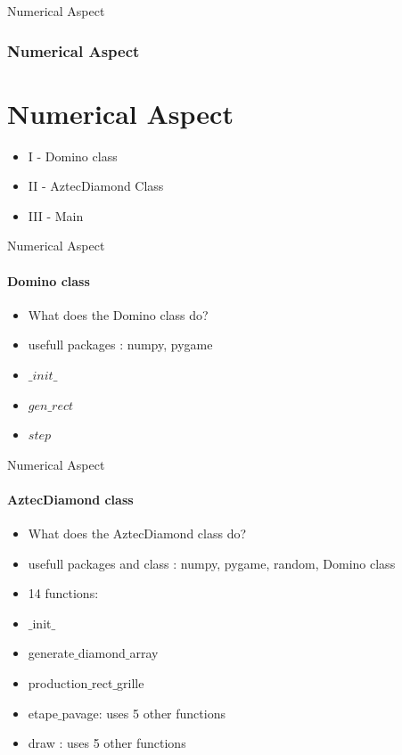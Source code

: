 \documentclass [xcolor=svgnames, t] {beamer}
\begin{document}
 \begin{frame}{Numerical Aspect}
 \frametitle{Numerical Aspect}
 \section{Numerical Aspect}


 \begin{itemize}
 
  \item I - Domino class
     \item II - AztecDiamond Class
     \item III - Main
     
 \end{itemize}

 \end{frame}






\begin{frame}{Numerical Aspect}
 \framesubtitle{Domino class}

\begin{itemize}
    \item  What does the Domino class do?
    \item usefull packages : numpy, pygame
    \item $\_ init \_$ 
    \item $gen\_rect$
    \item $step$
\end{itemize} 


\end{frame}







\begin{frame}{Numerical Aspect}
 \framesubtitle{AztecDiamond class}

\begin{itemize}
    \item What does the AztecDiamond class do?
    \item usefull packages and class : numpy, pygame, random, Domino class \
    \item 14 functions:
    \item  $\_$init$\_$
    \item generate$\_$diamond$\_$array
    \item production$\_$rect$\_$grille
    \item etape$\_$pavage: uses 5 other functions
    \item draw : uses 5 other functions
\end{itemize} 


\end{frame}
\end{document}

